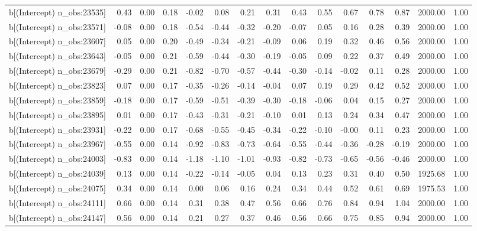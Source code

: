 \begin{table}[ht]
\begin{tabular}{rrrrrrrrrrrrrrr}
  b[(Intercept) n\_obs:23535] & 0.43 & 0.00 & 0.18 & -0.02 & 0.08 & 0.21 & 0.31 & 0.43 & 0.55 & 0.67 & 0.78 & 0.87 & 2000.00 & 1.00 \\ 
  b[(Intercept) n\_obs:23571] & -0.08 & 0.00 & 0.18 & -0.54 & -0.44 & -0.32 & -0.20 & -0.07 & 0.05 & 0.16 & 0.28 & 0.39 & 2000.00 & 1.00 \\ 
  b[(Intercept) n\_obs:23607] & 0.05 & 0.00 & 0.20 & -0.49 & -0.34 & -0.21 & -0.09 & 0.06 & 0.19 & 0.32 & 0.46 & 0.56 & 2000.00 & 1.00 \\ 
  b[(Intercept) n\_obs:23643] & -0.05 & 0.00 & 0.21 & -0.59 & -0.44 & -0.30 & -0.19 & -0.05 & 0.09 & 0.22 & 0.37 & 0.49 & 2000.00 & 1.00 \\ 
  b[(Intercept) n\_obs:23679] & -0.29 & 0.00 & 0.21 & -0.82 & -0.70 & -0.57 & -0.44 & -0.30 & -0.14 & -0.02 & 0.11 & 0.28 & 2000.00 & 1.00 \\ 
  b[(Intercept) n\_obs:23823] & 0.07 & 0.00 & 0.17 & -0.35 & -0.26 & -0.14 & -0.04 & 0.07 & 0.19 & 0.29 & 0.42 & 0.52 & 2000.00 & 1.00 \\ 
  b[(Intercept) n\_obs:23859] & -0.18 & 0.00 & 0.17 & -0.59 & -0.51 & -0.39 & -0.30 & -0.18 & -0.06 & 0.04 & 0.15 & 0.27 & 2000.00 & 1.00 \\ 
  b[(Intercept) n\_obs:23895] & 0.01 & 0.00 & 0.17 & -0.43 & -0.31 & -0.21 & -0.10 & 0.01 & 0.13 & 0.24 & 0.34 & 0.47 & 2000.00 & 1.00 \\ 
  b[(Intercept) n\_obs:23931] & -0.22 & 0.00 & 0.17 & -0.68 & -0.55 & -0.45 & -0.34 & -0.22 & -0.10 & -0.00 & 0.11 & 0.23 & 2000.00 & 1.00 \\ 
  b[(Intercept) n\_obs:23967] & -0.55 & 0.00 & 0.14 & -0.92 & -0.83 & -0.73 & -0.64 & -0.55 & -0.44 & -0.36 & -0.28 & -0.19 & 2000.00 & 1.00 \\ 
  b[(Intercept) n\_obs:24003] & -0.83 & 0.00 & 0.14 & -1.18 & -1.10 & -1.01 & -0.93 & -0.82 & -0.73 & -0.65 & -0.56 & -0.46 & 2000.00 & 1.00 \\ 
  b[(Intercept) n\_obs:24039] & 0.13 & 0.00 & 0.14 & -0.22 & -0.14 & -0.05 & 0.04 & 0.13 & 0.23 & 0.31 & 0.40 & 0.50 & 1925.68 & 1.00 \\ 
  b[(Intercept) n\_obs:24075] & 0.34 & 0.00 & 0.14 & 0.00 & 0.06 & 0.16 & 0.24 & 0.34 & 0.44 & 0.52 & 0.61 & 0.69 & 1975.53 & 1.00 \\ 
  b[(Intercept) n\_obs:24111] & 0.66 & 0.00 & 0.14 & 0.31 & 0.38 & 0.47 & 0.56 & 0.66 & 0.76 & 0.84 & 0.94 & 1.04 & 2000.00 & 1.00 \\ 
  b[(Intercept) n\_obs:24147] & 0.56 & 0.00 & 0.14 & 0.21 & 0.27 & 0.37 & 0.46 & 0.56 & 0.66 & 0.75 & 0.85 & 0.94 & 2000.00 & 1.00 \\ 

\end{tabular}
\end{table}
